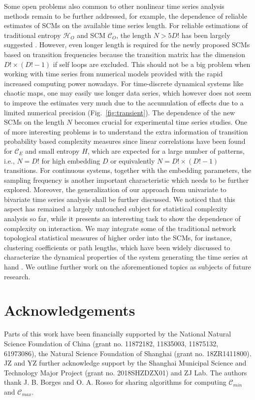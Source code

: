 \documentclass[aip,cha,reprint,nofootinbib]{revtex4-1}
\begin{document}
Some open problems also common to other nonlinear time series analysis methods remain to be further addressed, for example, the dependence of reliable estimates of SCMs on the available time series length. {\color{red}For reliable estimations of traditional entropy $\mathcal{H}_O$ and SCM $\mathcal{C}_O$, the length $N > 5 D!$ has been largely suggested \cite{BandtPRL2002,AmigoPTRSA2014}. However, even longer length is required for the newly proposed SCMs based on transition frequencies because the transition matrix has the dimension $D!\times (D! - 1)$ if self loops are excluded. This should not be a big problem when working with time series from numerical models provided with the rapid increased computing power nowadays. } For time-discrete dynamical systems like chaotic maps, one may easily use longer data series, which however does not seem to improve the estimates very much due to the accumulation of effects due to a limited numerical precision (Fig.~\ref{fig:transient}). {\color{red} The dependence of the new SCMs on the length $N$ becomes crucial for experimental time series studies. One of more interesting problems is to understand the extra information of transition probability based complexity measures since linear correlations have been found for $\mathcal{C}_{E}$ and small entropy $H$, which are expected for a large number of patterns, i.e., $N = D!$ for high embedding $D$ or equivalently $N = D! \times (D!-1)$ transitions. } For continuous systems, together with the embedding parameters, the sampling frequency is another important characteristic which needs to be further explored. Moreover, the generalization of our approach from univariate to bivariate time series analysis shall be further discussed. We noticed that this aspect has remained a largely untouched subject for statistical complexity analysis so far, while it presents an interesting task to show the dependence of complexity on interaction. {\color{red} We may integrate some of the traditional network topological statistical measures of higher order into the SCMs, for instance, clustering coefficients or path lengths, which have been widely discussed to characterize the dynamical properties of the system generating the time series at hand \cite{ZouPR2018}.} We outline further work on the aforementioned topics as subjects of future research. 

\section*{Acknowledgements}
Parts of this work have been financially supported by the National Natural Science Foundation of China (grant no. 11872182, 11835003, 11875132, 61973086), the Natural Science Foundation of Shanghai (grant no. 18ZR1411800). JZ and YZ further acknowledge support by the Shanghai Municipal Science and Technology Major Project (grant no. 2018SHZDZX01) and ZJ Lab. The authors thank J. B. Borges and O. A. Rosso for sharing algorithms for computing $\mathcal{C}_{min}$ and $\mathcal{C}_{max}$. 
\end{document}
